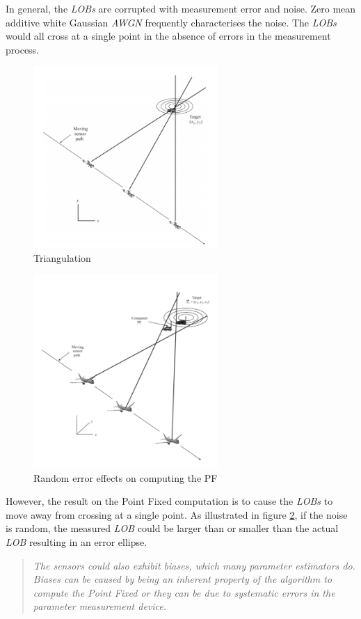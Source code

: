 \documentclass[english,purist]{ist-report}
\begin{document}
In general, the \textit{LOBs} are corrupted with measurement error and noise. Zero mean additive white Gaussian \textit{AWGN} frequently characterises the noise. The \textit{LOBs} would all cross at a single point in the absence of errors in the measurement process. 


\begin{figure}[ht]
\centering
\includegraphics[width=70mm]{target5.png}
\caption{Triangulation}
\label{target5}
\end{figure} 
 
\begin{figure}[ht]
\centering
\includegraphics[width=70mm]{target6.png}
\caption{Random error effects on computing the PF}
\label{target6}
\end{figure} 

However, the result on the Point Fixed computation is to cause the \textit{LOBs} to move away from crossing at a single point. As illustrated in figure \ref{target6}, if the noise is random, the measured \textit{LOB} could be larger than or smaller than the actual \textit{LOB} resulting in an error ellipse. 

\begin{quote} \itshape
The sensors could also exhibit biases, which many parameter estimators do. Biases can be caused by being an inherent property of the algorithm to compute the Point Fixed or they can be due to systematic errors in the parameter measurement device. \end{quote}\cite{poiseltarget}
\end{document}
